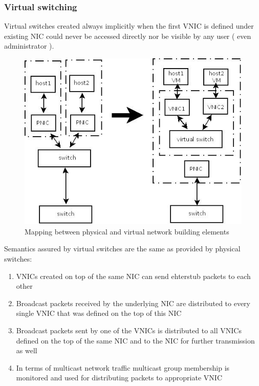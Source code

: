 \documentclass[11pt]{book}
\begin{document}
			\subsubsection{Virtual switching}
			
			Virtual switches created always implicitly when the first VNIC is defined under existing NIC could never be accessed directly nor be visible by
			any user ( even administrator ). 
			
			\begin{figure}[H]
				\includegraphics[width=\textwidth]{img/physical_and_virtual_switches_mapping.jpeg}
				\caption{Mapping between physical and virtual network building elements}
			\end{figure}
			
			Semantics assured by virtual switches are the same as provided by physical switches: 
			\begin{enumerate}
				\item{VNICs created on top of the same NIC can send ehterstub packets to each other}
				\item{Broadcast packets received by the underlying NIC are distributed to every single VNIC that was defined on the top of this NIC}
				\item{Broadcast packets sent by one of the VNICs is distributed to all VNICs defined on the top of the same NIC and to the NIC for further transmission as well}
				\item{In terms of multicast network traffic multicast group membership is monitored and used for distributing packets to appropriate VNIC}
			\end{enumerate}
\end{document}

